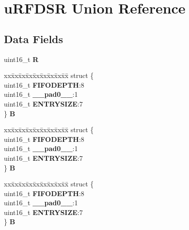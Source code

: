 \hypertarget{unionuRFDSR}{}\section{u\+R\+F\+D\+SR Union Reference}
\label{unionuRFDSR}
\subsection*{Data Fields}
\begin{DoxyCompactItemize}
\item 
\mbox{\label{unionuRFDSR_a6a0f1c81aaf15e63b20f678bd69d02e5}} 
uint16\+\_\+t {\bfseries R}
\item 
\mbox{\label{unionuRFDSR_afde9a578ad9f3dffe4df4f9b154871dd}} 
\begin{tabbing}
xx\=xx\=xx\=xx\=xx\=xx\=xx\=xx\=xx\=\kill
struct \{\\
\>uint16\_t {\bfseries FIFODEPTH}:8\\
\>uint16\_t {\bfseries \_\_pad0\_\_}:1\\
\>uint16\_t {\bfseries ENTRYSIZE}:7\\
\} {\bfseries B}\\

\end{tabbing}\item 
\mbox{\label{unionuRFDSR_a2e6cfbd12a64f6b6700d3759a0b565f0}} 
\begin{tabbing}
xx\=xx\=xx\=xx\=xx\=xx\=xx\=xx\=xx\=\kill
struct \{\\
\>uint16\_t {\bfseries FIFODEPTH}:8\\
\>uint16\_t {\bfseries \_\_pad0\_\_}:1\\
\>uint16\_t {\bfseries ENTRYSIZE}:7\\
\} {\bfseries B}\\

\end{tabbing}\item 
\mbox{\label{unionuRFDSR_abb228ab5197a95eb3419541356df926f}} 
\begin{tabbing}
xx\=xx\=xx\=xx\=xx\=xx\=xx\=xx\=xx\=\kill
struct \{\\
\>uint16\_t {\bfseries FIFODEPTH}:8\\
\>uint16\_t {\bfseries \_\_pad0\_\_}:1\\
\>uint16\_t {\bfseries ENTRYSIZE}:7\\
\} {\bfseries B}\\


\end{tabbing}
\end{DoxyCompactItemize}
